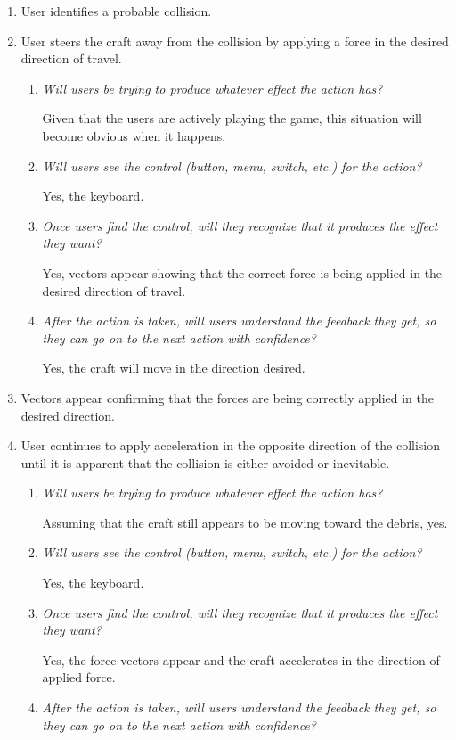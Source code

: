 \begin{enumerate}
\begin{enumerate}
  \item User identifies a probable collision.

  \item User steers the craft away from the collision by applying a force in the desired direction of travel.
  \begin{enumerate}
    \item \emph{Will users be trying to produce whatever effect the action has?}
	  
    Given that the users are actively playing the game, this situation will become obvious when it happens.
    \item \emph{Will users see the control (button, menu, switch, etc.) for the action?}

    Yes, the keyboard.
    \item \emph{Once users find the control, will they recognize that it produces the effect they want?}

    Yes, vectors appear showing that the correct force is being applied in the desired direction of travel.
    \item \emph{After the action is taken, will users understand the feedback they get, so they can go on to the next action with confidence?}

    Yes, the craft will move in the direction desired.
  \end{enumerate}

  \item Vectors appear confirming that the forces are being correctly applied in the desired direction.

  \item User continues to apply acceleration in the opposite direction of the collision until it is apparent that the collision is either avoided or inevitable.
  \begin{enumerate}
    \item \emph{Will users be trying to produce whatever effect the action has?}
		
    Assuming that the craft still appears to be moving toward the debris, yes.
    \item \emph{Will users see the control (button, menu, switch, etc.) for the action?}

    Yes, the keyboard.
    \item \emph{Once users find the control, will they recognize that it produces the effect they want?}

    Yes, the force vectors appear and the craft accelerates in the direction of applied force.
    \item \emph{After the action is taken, will users understand the feedback they get, so they can go on to the next action with confidence?}


\end{enumerate}
\end{enumerate}
\end{enumerate}
